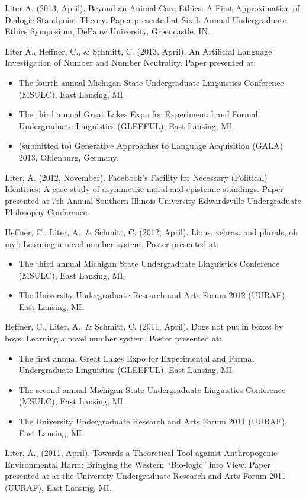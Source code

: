 \documentclass[11pt,a4paper,sans]{moderncv}   %
\begin{document}
\begin{fakebib}
Liter A. (2013, April). Beyond an Animal Care Ethics: A First Approximation of Dialogic Standpoint Theory. Paper presented at Sixth Annual Undergraduate Ethics Symposium, DePauw University, Greencastle, IN.

Liter A., Heffner, C., \& Schmitt, C. (2013, April). An Artificial Language Investigation of Number and Number Neutrality. Paper presented at:
\begin{itemize}[leftmargin=.25in]
\item The fourth annual Michigan State Undergraduate Linguistics Conference (MSULC), East Lansing, MI.
\item The third annual Great Lakes Expo for Experimental and Formal Undergraduate Linguistics (GLEEFUL), East Lansing, MI.
\item (submitted to) Generative Approaches to Language Acquisition (GALA) 2013, Oldenburg, Germany.
\end{itemize}

Liter, A. (2012, November). Facebook's Facility for Necessary (Political) Identities: A case study of asymmetric moral and epistemic standings. Paper presented at  7th Annual Southern Illinois University Edwardsville Undergraduate Philosophy Conference. 

Heffner, C., Liter, A., \& Schmitt, C. (2012, April). Lions, zebras, and plurals, oh my!: Learning a novel number system. Poster presented at:
\begin{itemize}[leftmargin=.25in]
\item The third annual Michigan State Undergraduate Linguistics Conference (MSULC), East Lansing, MI.
\item The University Undergraduate Research and Arts Forum 2012 (UURAF), East Lansing, MI.
\end{itemize}

Heffner, C., Liter, A., \& Schmitt, C. (2011, April). Dogs not put in boxes by boys: Learning a novel number system. Poster presented at:
\begin{itemize}[leftmargin=.25in]
\item The first annual Great Lakes Expo for Experimental and Formal Undergraduate Linguistics (GLEEFUL), East
Lansing, MI.
\item The second annual Michigan State Undergraduate Linguistics Conference (MSULC), East Lansing, MI.
\item The University Undergraduate Research and Arts Forum 2011 (UURAF), East Lansing, MI.
\end{itemize}

Liter, A., (2011, April). Towards a Theoretical Tool against Anthropogenic Environmental Harm: Bringing the Western ``Bio-logic'' into View. Paper presented at at the University Undergraduate Research and Arts Forum 2011 (UURAF), East Lansing, MI. %

\end{fakebib}
\end{document}
